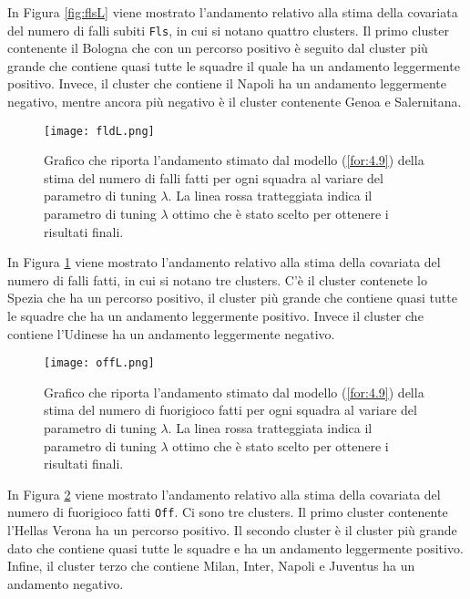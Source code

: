 In Figura \ref{fig:flsL} viene mostrato l'andamento relativo alla stima della covariata del numero di falli subiti \texttt{Fls}, in cui si notano quattro clusters. Il primo cluster contenente il Bologna che con un percorso positivo è seguito dal cluster più grande che contiene quasi tutte le squadre il quale ha un andamento leggermente positivo. Invece, il cluster che contiene il Napoli ha un andamento leggermente negativo, mentre ancora più negativo è il cluster contenente Genoa e Salernitana.

\begin{figure}[htbp]
	\begin{center}
		\texttt{[image: fldL.png]}
		\caption{Grafico che riporta l'andamento stimato dal modello (\ref{for:4.9}) della stima del numero di falli fatti per ogni squadra al variare del parametro di tuning $\lambda$. La linea rossa tratteggiata indica il parametro di tuning $\lambda$ ottimo che è stato scelto per ottenere i risultati finali.} \label{fig:fldL}
	\end{center}
\end{figure}

In Figura \ref{fig:fldL} viene mostrato l'andamento relativo alla stima della covariata del numero di falli fatti, in cui si notano tre clusters. C'è il cluster contenete lo Spezia che ha un percorso positivo, il cluster più grande che contiene quasi tutte le squadre che ha un andamento leggermente positivo. Invece il cluster che contiene l'Udinese ha un andamento leggermente negativo.

\begin{figure}[htbp]
	\begin{center}
		\texttt{[image: offL.png]}
		\caption{Grafico che riporta l'andamento stimato dal modello (\ref{for:4.9}) della stima del numero di fuorigioco fatti per ogni squadra al variare del parametro di tuning $\lambda$. La linea rossa tratteggiata indica il parametro di tuning $\lambda$ ottimo che è stato scelto per ottenere i risultati finali.} \label{fig:offL}
	\end{center}
\end{figure}

In Figura \ref{fig:offL} viene mostrato l'andamento relativo alla stima della covariata del numero di fuorigioco fatti \texttt{Off}. Ci sono tre clusters. Il primo cluster contenente l'Hellas Verona ha un percorso positivo. Il secondo cluster è il cluster più grande dato che contiene quasi tutte le squadre e ha un andamento leggermente positivo. Infine, il cluster terzo che contiene Milan, Inter, Napoli e Juventus ha un andamento negativo.

